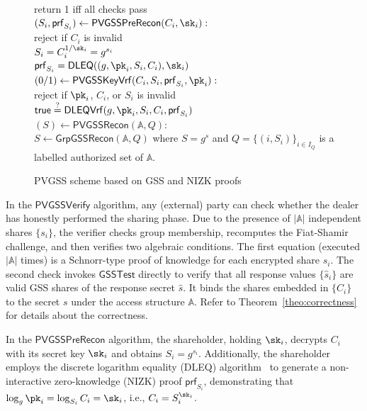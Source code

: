 \documentclass[runningheads]{llncs}
\newcommand{\gsstest}{\mathsf{GSSTest}}
\newcommand{\ggssrecon}{\mathsf{GrpGSSRecon}}
\newcommand{\pvgssVerify}{\mathsf{PVGSSVerify}}
\newcommand{\pvgssPreRecon}{\mathsf{PVGSSPreRecon}}
\newcommand{\pvgssKeyVrf}{\mathsf{PVGSSKeyVrf}}
\newcommand{\pvgssRecon}{\mathsf{PVGSSRecon}}
\newcommand{\dleq}{\mathsf{DLEQ}}
\newcommand{\dleqVrf}{\mathsf{DLEQVrf}}
\newcommand{\proofs}{\mathsf{prf}}
\newcommand{\true}{\textsf{true}}
\begin{document}
\begin{figure}[!h]
{\begin{minipage}{0.95\linewidth}
{        \setlength{\parindent}{1.8em}return 1 iff all checks pass\\
    \underline{$(S_i, \proofs_{S_i}) \gets \pvgssPreRecon(C_i, \sk_i):$} \\
        \setlength{\parindent}{1.8em}reject if $C_i$ is invalid\\
        \setlength{\parindent}{1.8em}$S_i=C_i^{1/\sk_i}=g^{s_i}$\\
        \setlength{\parindent}{1.8em}$\proofs_{S_i}=\dleq((g,\pk_i,S_i,C_i),\sk_i)$\\
    \underline{$(0/1) \gets \pvgssKeyVrf(C_i, S_i, \proofs_{S_i}, \pk_i):$} \\
        \setlength{\parindent}{1.8em}reject if $\pk_i$, $C_i$, or $S_i$ is invalid\\
        \setlength{\parindent}{1.8em}$\true\overset{?}{=}\dleqVrf(g,\pk_i,S_i,C_i,\proofs_{S_i})$\\
    \underline{$(S) \gets \pvgssRecon(\mathbb{A},Q):$} \\
        \setlength{\parindent}{1.8em}$S\gets \ggssrecon(\mathbb{A},Q)$ where $S=g^s$ and $Q=\{(i,S_i)\}_{i\in I_Q}$ is a labelled authorized set of $\mathbb{A}$.
    }
    \end{minipage}
}
    \caption{\label{fig:pvgss_using_gss}PVGSS scheme based on GSS and NIZK proofs}
\end{figure}

In the $\pvgssVerify$ algorithm, any (external) party can check whether the dealer has honestly performed the sharing phase.
Due to the presence of \(|\mathbb{A}|\) independent shares \(\{s_i\}\), the verifier checks group membership, recomputes the Fiat-Shamir challenge, and then verifies two algebraic conditions.
The first equation (executed \( |\mathbb{A}| \) times) is a Schnorr-type proof of knowledge for each encrypted share \(s_i\).
The second check invokes \(\gsstest\) directly to verify that all response values $\{\hat{s}_i\}$ are valid GSS shares of the response secret \(\hat{s}\). It binds the shares embedded in \(\{C_i\}\) to the secret \(s\) under the access structure \(\mathbb{A}\).
Refer to Theorem~\ref{theo:correctness} for details about the correctness.

In the $\pvgssPreRecon$ algorithm, the shareholder, holding $\sk_i$, decrypts $C_i$ with its secret key $\sk_i$ and obtains $S_i=g^{s_i}$.
Additionally, the shareholder employs the discrete logarithm equality (DLEQ) algorithm~\cite{Chaum1992DLEQ} to generate a non-interactive zero-knowledge (NIZK) proof \(\proofs_{S_i}\), demonstrating that \(\log_g \pk_i = \log_{S_i} C_i = \sk_i\), i.e., \(C_i=S_i^{\sk_i}\).
\end{document}
